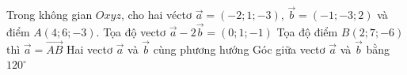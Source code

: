 \begin{ex}%
	Trong không gian $Oxyz$, cho hai véctơ $\overrightarrow{a}=(-2;1;-3)$,  $\overrightarrow{b}=(-1;-3;2)$ và điểm $A(4;6;-3)$.
	\choiceTF 
		{Tọa độ vectơ  $\overrightarrow{a}-2\overrightarrow{b}=(0;1;-1)$}
		{\True Tọa  độ điểm $B(2;7;-6)$ thì $\overrightarrow{a}=\overrightarrow{AB}$}
		{Hai vectơ $\overrightarrow{a}$ và $\overrightarrow{b}$ cùng phương hướng} 
		{\True Góc giữa vectơ $\overrightarrow{a}$ và $\overrightarrow{b}$ bằng $120^\circ$} 
\end{ex}

